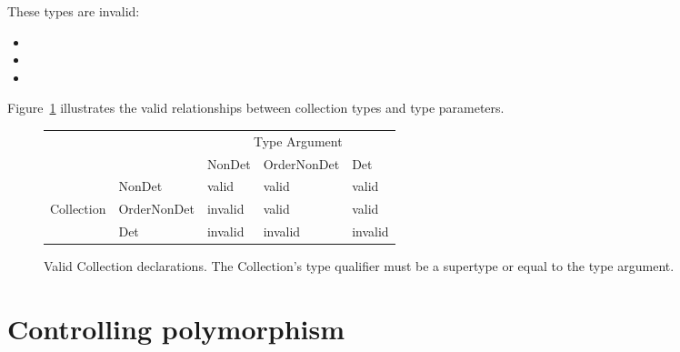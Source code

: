 These types are invalid:
  \begin{itemize}
    \item {}
    \item {}
    \item {}
  \end{itemize}

Figure~\ref{fig-determinism-collections} illustrates the valid
relationships between collection types and type parameters.

\begin{figure}
  \centering
  \begin{tabular}{|l|l|l|l|l|}
    \cline{3-5}
    \multicolumn{2}{c|}{~}  &  \multicolumn{3}{c|}{Type Argument} \\ \cline{3-5}
    \multicolumn{2}{c|}{~}  & NonDet     & OrderNonDet & Det \\ \hline
              & NonDet      &   valid    &  valid      & valid  \\ \cline{2-5}
Collection    & OrderNonDet &   invalid  &  valid      & valid  \\ \cline{2-5}
              & Det         &   invalid  &  invalid    & invalid      \\ \hline
  \end{tabular}
  \caption{Valid Collection declarations.  The Collection's type qualifier
    must be a supertype or equal to the type argument.}
  \label{fig-determinism-collections}
\end{figure}





\section{Controlling polymorphism\label{determinism-polymorphism}}

